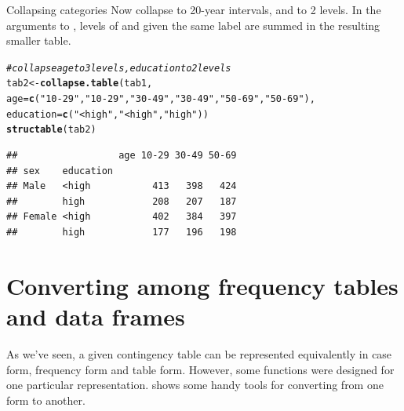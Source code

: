 \documentclass[11pt]{book}\usepackage[]{graphicx}\usepackage[]{color}
\makeatletter
\newcommand{\hlstr}[1]{\textcolor[rgb]{0.192,0.494,0.8}{#1}}%
\newcommand{\hlcom}[1]{\textcolor[rgb]{0.678,0.584,0.686}{\textit{#1}}}%
\newcommand{\hlstd}[1]{\textcolor[rgb]{0.345,0.345,0.345}{#1}}%
\newcommand{\hlkwb}[1]{\textcolor[rgb]{0.69,0.353,0.396}{#1}}%
\newcommand{\hlkwc}[1]{\textcolor[rgb]{0.333,0.667,0.333}{#1}}%
\newcommand{\hlkwd}[1]{\textcolor[rgb]{0.737,0.353,0.396}{\textbf{#1}}}%
\newenvironment{kframe}{%
 \def\at@end@of@kframe{}%
 \ifinner\ifhmode%
  \def\at@end@of@kframe{\end{minipage}}%
  \begin{minipage}{\columnwidth}%
 \fi\fi%
 \def\FrameCommand##1{\hskip\@totalleftmargin \hskip-\fboxsep
 \colorbox{shadecolor}{##1}\hskip-\fboxsep
     \hskip-\linewidth \hskip-\@totalleftmargin \hskip\columnwidth}%
 \MakeFramed {\advance\hsize-\width
   \@totalleftmargin\z@ \linewidth\hsize
   \@setminipage}}%
 {\par\unskip\endMakeFramed%
 \at@end@of@kframe}
\newenvironment{knitrout}{}{} %
\renewenvironment{knitrout}{\small\renewcommand{\baselinestretch}{.85}}{} %
\makeatother
\begin{document}
\begin{Example}{Collapsing categories}
Now collapse  to 20-year intervals, and 
to 2 levels. In the arguments to , levels of  and 
given the same label are summed in the resulting smaller table.
\begin{knitrout}
\color{fgcolor}\begin{kframe}
\begin{alltt}
\hlcom{# collapse age to 3 levels, education to 2 levels}
\hlstd{tab2} \hlkwb{<-} \hlkwd{collapse.table}\hlstd{(tab1,}
         \hlkwc{age}\hlstd{=}\hlkwd{c}\hlstd{(}\hlstr{"10-29"}\hlstd{,} \hlstr{"10-29"}\hlstd{,}  \hlstr{"30-49"}\hlstd{,} \hlstr{"30-49"}\hlstd{,} \hlstr{"50-69"}\hlstd{,} \hlstr{"50-69"}\hlstd{),}
         \hlkwc{education}\hlstd{=}\hlkwd{c}\hlstd{(}\hlstr{"<high"}\hlstd{,} \hlstr{"<high"}\hlstd{,} \hlstr{"high"}\hlstd{))}
\hlkwd{structable}\hlstd{(tab2)}
\end{alltt}
\begin{verbatim}
##                  age 10-29 30-49 50-69
## sex    education                      
## Male   <high           413   398   424
##        high            208   207   187
## Female <high           402   384   397
##        high            177   196   198
\end{verbatim}
\end{kframe}
\end{knitrout}

\end{Example}

\section{Converting among frequency tables and data frames}\label{sec:convert}

As we've seen, a given contingency table can be represented 
equivalently in case form, frequency form and table form.
However, some \R functions were designed for one particular representation.
 shows some handy tools for converting from one form to another.
\end{document}
